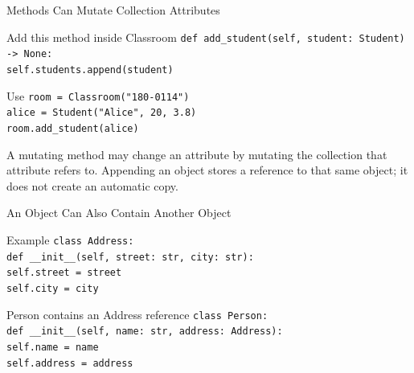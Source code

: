\documentclass[aspectratio=169,10pt]{beamer}
\begin{document}
\begin{frame}{Methods Can Mutate Collection Attributes}
  \begin{block}{Add this method inside Classroom}
    \texttt{def add\_student(self, student: Student) -> None:}\\
    \hspace*{0.20in}\texttt{self.students.append(student)}
  \end{block}

  \begin{block}{Use}
    \texttt{room = Classroom("180-0114")}\\
    \texttt{alice = Student("Alice", 20, 3.8)}\\
    \texttt{room.add\_student(alice)}
  \end{block}

  \begin{keyidea}
    A mutating method may change an attribute by mutating the collection that attribute refers to. Appending an object stores a reference to that same object; it does not create an automatic copy.
  \end{keyidea}
\end{frame}

\begin{frame}{An Object Can Also Contain Another Object}
  \begin{block}{Example}
    \texttt{class Address:}\\
    \hspace*{0.20in}\texttt{def \_\_init\_\_(self, street: str, city: str):}\\
    \hspace*{0.40in}\texttt{self.street = street}\\
    \hspace*{0.40in}\texttt{self.city = city}
  \end{block}

  \begin{block}{Person contains an Address reference}
    \texttt{class Person:}\\
    \hspace*{0.20in}\texttt{def \_\_init\_\_(self, name: str, address: Address):}\\
    \hspace*{0.40in}\texttt{self.name = name}\\
    \hspace*{0.40in}\texttt{self.address = address}
  \end{block}
\end{frame}
\end{document}
